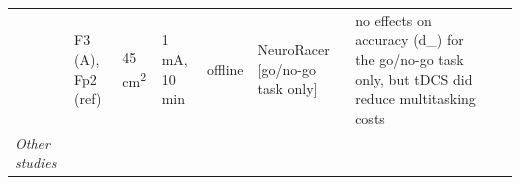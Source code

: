 \documentclass[11pt,]{memoir}
\begin{document}
\begin{longtable}[]{@{}lllllllll@{}}
\begin{minipage}[t]{0.04\columnwidth}
\end{minipage} & \begin{minipage}[t]{0.10\columnwidth}\raggedright
F3 (A), Fp2 (ref)\strut
\end{minipage} & \begin{minipage}[t]{0.03\columnwidth}\raggedright
45
cm\textsuperscript{2}\strut
\end{minipage} & \begin{minipage}[t]{0.05\columnwidth}\raggedright
1 mA, 10
min\strut
\end{minipage} & \begin{minipage}[t]{0.06\columnwidth}\raggedright
offline\strut
\end{minipage} & \begin{minipage}[t]{0.12\columnwidth}\raggedright
NeuroRacer {[}go/no-go task
only{]}\strut
\end{minipage} & \begin{minipage}[t]{0.25\columnwidth}\raggedright
no effects on accuracy (d\_) for the go/no-go task only,
but tDCS did reduce multitasking costs\strut
\end{minipage}\tabularnewline
\begin{minipage}[t]{0.09\columnwidth}\raggedright
\emph{Other studies}\strut
\end{minipage} & \begin{minipage}[t]{0.02\columnwidth}\raggedright
\strut
\end{minipage} & \begin{minipage}[t]{0.04\columnwidth}\raggedright
\strut
\end{minipage} & \begin{minipage}[t]{0.10\columnwidth}\raggedright
\strut
\end{minipage} & \begin{minipage}[t]{0.03\columnwidth}\raggedright
\strut
\end{minipage} & \begin{minipage}[t]{0.05\columnwidth}\raggedright
\strut
\end{minipage} & \begin{minipage}[t]{0.06\columnwidth}\raggedright
\strut
\end{minipage} & \begin{minipage}[t]{0.12\columnwidth}\raggedright
\strut
\end{minipage} & \begin{minipage}[t]{0.25\columnwidth}\raggedright
\strut
\end{minipage}\tabularnewline

\end{longtable}
\end{document}
